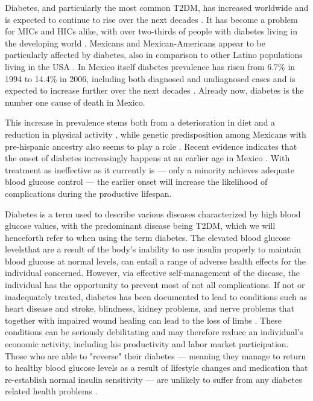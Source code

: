 \documentclass[12pt,english]{article}
\begin{document}
Diabetes, and particularly the most common \ac{T2DM}, has increased worldwide and is expected to continue to rise over the next decades \parencite{Risk2016}. It has become a problem for \ac{MICs} and \ac{HICs} alike, with over two-thirds of people with diabetes living in the developing world \parencite{InternationalDiabetesFederation2013}. Mexicans and Mexican-Americans appear to be particularly affected by diabetes, also in comparison to other Latino populations living in the \ac{USA} \parencite{Schneiderman2014}. In Mexico itself diabetes prevalence has risen from 6.7\% in 1994 to 14.4\% in 2006, including both diagnosed and undiagnosed cases \parencite{Barquera2013} and is expected to increase further over the next decades \parencite{Meza2015}. Already now, diabetes is the number one cause of death in Mexico. 

This increase in prevalence stems both from a deterioration in diet and a reduction in physical activity \parencite{Barquera2008b,Basu2013}, while genetic predisposition among Mexicans with pre-hispanic ancestry also seems to play a role \parencite{Williams2013}. Recent evidence indicates that the onset of diabetes increasingly happens at an earlier age in Mexico \parencite{Villalpando2010}. With treatment as ineffective as it currently is --- only a minority achieves adequate blood glucose control  \parencite{Barquera2013} --- the earlier onset will increase the likelihood of complications during the productive lifespan. 

Diabetes is a term used to describe various diseases characterized by high blood glucose values, with the predominant disease being \ac{T2DM}, which we will henceforth refer to when using the term diabetes. The elevated
blood glucose levelsthat are a result of the body's inability to use insulin properly to maintain blood glucose at normal levels, can entail a range of adverse health effects for the individual concerned. However, via effective self-management of the disease, the individual has the opportunity to prevent most of not all complications.   If not or inadequately treated, diabetes has been documented to lead to conditions such as heart  disease and stroke, blindness, kidney problems, and nerve problems that together with impaired wound healing can lead to the loss of limbs \parencite{Reynoso-Noveron2011}. These conditions can be seriously debilitating and may therefore reduce an individual's economic activity, including his productivity and labor market participation.  Those who are able to "reverse" their diabetes --- meaning they manage to return to healthy blood glucose levels as a result of lifestyle changes and medication that re-establish normal insulin sensitivity --- are unlikely to suffer from any diabetes related health problems \parencite{Lim2011, Gregg2012}.
\end{document}
